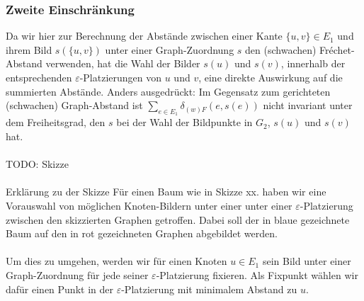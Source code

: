 \documentclass[a4paper, 12pt, twoside]{article}
\theoremstyle{Format1} %
\begin{document}
\subsubsection{Zweite Einschränkung} \label {Zweite Einschränkung}
Da wir hier zur Berechnung der Abstände zwischen einer Kante $\{u,v\} \in E_1$ und ihrem Bild $s(\{u,v\})$ unter einer Graph-Zuordnung $s$ den (schwachen) Fréchet-Abstand verwenden,
hat die Wahl der Bilder $s(u)$ und $s(v)$, innerhalb der entsprechenden $\varepsilon$-Platzierungen von $u$ und $v$, eine direkte Auswirkung auf die summierten Abstände.
Anders ausgedrückt: Im Gegensatz zum gerichteten (schwachen) Graph-Abstand ist $\sum_{e \in E_1}\delta_{(w)F}(e, s(e))$ nicht invariant unter dem Freiheitsgrad, den $s$
bei der Wahl der Bildpunkte in $G_2$, $s(u)$ und $s(v)$ hat.
\\
\\
TODO: Skizze
\\
\\
Erklärung zu der Skizze
Für einen Baum wie in Skizze xx. haben wir eine Vorauswahl von möglichen Knoten-Bildern unter einer unter einer $\varepsilon$-Platzierung zwischen den skizzierten Graphen getroffen.
Dabei soll der in blaue gezeichnete Baum auf den in rot gezeichneten Graphen abgebildet werden.
\\
\\
Um dies zu umgehen, werden wir für einen Knoten $u \in E_1$ sein Bild unter einer Graph-Zuordnung für jede seiner $\varepsilon$-Platzierung fixieren.
Als Fixpunkt wählen wir dafür einen Punkt in der $\varepsilon$-Platzierung mit minimalem Abstand zu $u$.
\end{document}
